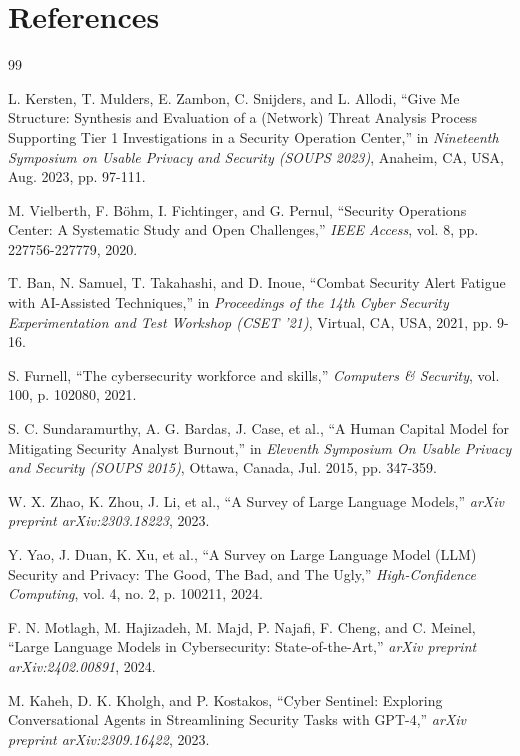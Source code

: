 \documentclass[12pt,a4paper]{report}
\begin{document}
\chapter{References}
\begin{thebibliography}{99}

 L. Kersten, T. Mulders, E. Zambon, C. Snijders, and L. Allodi, ``Give Me Structure: Synthesis and Evaluation of a (Network) Threat Analysis Process Supporting Tier 1 Investigations in a Security Operation Center,'' in \textit{Nineteenth Symposium on Usable Privacy and Security (SOUPS 2023)}, Anaheim, CA, USA, Aug. 2023, pp. 97-111.

 M. Vielberth, F. Böhm, I. Fichtinger, and G. Pernul, ``Security Operations Center: A Systematic Study and Open Challenges,'' \textit{IEEE Access}, vol. 8, pp. 227756-227779, 2020.

 T. Ban, N. Samuel, T. Takahashi, and D. Inoue, ``Combat Security Alert Fatigue with AI-Assisted Techniques,'' in \textit{Proceedings of the 14th Cyber Security Experimentation and Test Workshop (CSET '21)}, Virtual, CA, USA, 2021, pp. 9-16.

 S. Furnell, ``The cybersecurity workforce and skills,'' \textit{Computers \& Security}, vol. 100, p. 102080, 2021.

 S. C. Sundaramurthy, A. G. Bardas, J. Case, et al., ``A Human Capital Model for Mitigating Security Analyst Burnout,'' in \textit{Eleventh Symposium On Usable Privacy and Security (SOUPS 2015)}, Ottawa, Canada, Jul. 2015, pp. 347-359.

 W. X. Zhao, K. Zhou, J. Li, et al., ``A Survey of Large Language Models,'' \textit{arXiv preprint arXiv:2303.18223}, 2023.

 Y. Yao, J. Duan, K. Xu, et al., ``A Survey on Large Language Model (LLM) Security and Privacy: The Good, The Bad, and The Ugly,'' \textit{High-Confidence Computing}, vol. 4, no. 2, p. 100211, 2024.

 F. N. Motlagh, M. Hajizadeh, M. Majd, P. Najafi, F. Cheng, and C. Meinel, ``Large Language Models in Cybersecurity: State-of-the-Art,'' \textit{arXiv preprint arXiv:2402.00891}, 2024.

 M. Kaheh, D. K. Kholgh, and P. Kostakos, ``Cyber Sentinel: Exploring Conversational Agents in Streamlining Security Tasks with GPT-4,'' \textit{arXiv preprint arXiv:2309.16422}, 2023.


\end{thebibliography}
\end{document}
